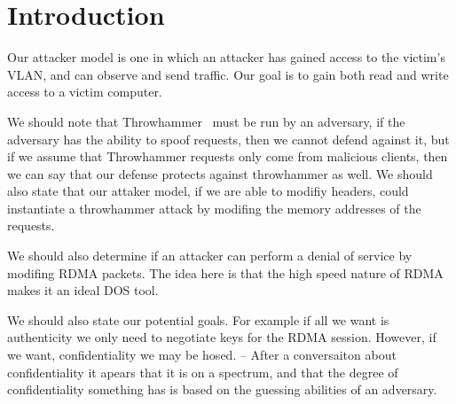 \section{Introduction}
\label{sec:intro}

Our attacker model is one in which an attacker has gained access to the victim's
VLAN, and can observe and send traffic. Our goal is to gain both read and write access to a victim computer.

We should note that Throwhammer~\cite{216055} must be run by an adversary, if
the adversary has the ability to spoof requests, then we cannot defend against
it, but if we assume that Throwhammer requests only come from malicious
clients, then we can say that our defense protects against throwhammer as well.
We should also state that our attaker model, if we are able to modifiy headers,
could instantiate a throwhammer attack by modifing the memory addresses of the
requests.

We should also determine if an attacker can perform a denial of service by
modifing RDMA packets. The idea here is that the high speed nature of RDMA
makes it an ideal DOS tool.

We should also state our potential goals. For example if all we want is
authenticity we only need to negotiate keys for the RDMA session. However, if
we want, confidentiality we may be hosed. -- After a conversaiton about
confidentiality it apears that it is on a spectrum, and that the degree of
confidentiality something has is based on the guessing abilities of an
adversary.


